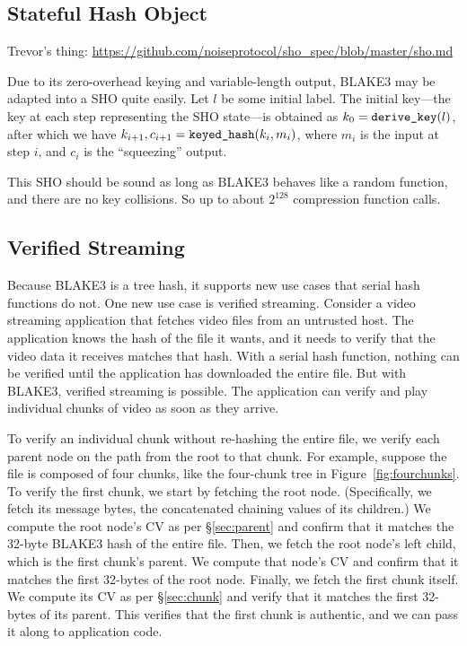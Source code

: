 \documentclass[11pt,notitlepage,a4paper]{article}
\newcommand{\flag}[1]{\texttt{\detokenize{#1}}\xspace}
\begin{document}
\subsection{Stateful Hash Object}\label{sec:sho}

Trevor's thing: \url{https://github.com/noiseprotocol/sho_spec/blob/master/sho.md}

Due to its zero-overhead keying and variable-length output, BLAKE3 may be adapted into a SHO quite easily. Let $l$ be some initial label. The initial key---the key at each step representing the SHO state---is obtained as $k_0 =\text{\flag{derive_key}}(l)$, after which we have $k_{i+1}, c_{i+1} = \text{\flag{keyed_hash}}(k_i, m_i)$, where $m_i$ is the input at step $i$, and $c_i$ is the ``squeezing'' output.

This SHO should be sound as long as BLAKE3 behaves like a random function, and there are no key collisions. So up to about $2^{128}$ compression function calls.

\subsection{Verified Streaming}\label{sec:verifiedstreaming}

Because BLAKE3 is a tree hash, it supports new use cases that serial hash
functions do not. One new use case is verified streaming. Consider a video
streaming application that fetches video files from an untrusted host. The
application knows the hash of the file it wants, and it needs to verify that
the video data it receives matches that hash. With a serial hash function,
nothing can be verified until the application has downloaded the entire file.
But with BLAKE3, verified streaming is possible. The application can verify and
play individual chunks of video as soon as they arrive.

To verify an individual chunk without re-hashing the entire file, we verify
each parent node on the path from the root to that chunk. For example, suppose
the file is composed of four chunks, like the four-chunk tree in
Figure~\ref{fig:fourchunks}. To verify the first chunk, we start by fetching
the root node. (Specifically, we fetch its message bytes, the concatenated
chaining values of its children.) We compute the root node's CV as per
\S\ref{sec:parent} and confirm that it matches the 32-byte BLAKE3 hash of the
entire file. Then, we fetch the root node's left child, which is the first
chunk's parent. We compute that node's CV and confirm that it matches the first
32-bytes of the root node. Finally, we fetch the first chunk itself. We compute
its CV as per \S\ref{sec:chunk} and verify that it matches the first 32-bytes
of its parent. This verifies that the first chunk is authentic, and we can pass
it along to application code.
\end{document}
